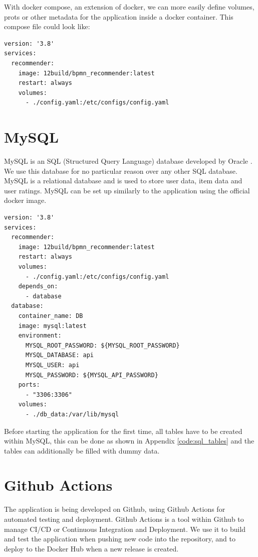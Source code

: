 With docker compose, an extension of docker, we can more easily define volumes, prots or other metadata for the application inside a docker container. This compose file could look like:

\begin{verbatim}
version: '3.8'
services:
  recommender:
    image: 12build/bpmn_recommender:latest
    restart: always
    volumes:
      - ./config.yaml:/etc/configs/config.yaml
\end{verbatim}

\section{MySQL}

\label{sec:sql}

MySQL is an SQL (Structured Query Language) database developed by Oracle \cite{MySQL}. We use this database for no particular reason over any other SQL database. MySQL is a relational database and is used to store user data, item data and user ratings. MySQL can be set up similarly to the application using the official docker image.

\begin{verbatim}
version: '3.8'
services:
  recommender:
    image: 12build/bpmn_recommender:latest
    restart: always
    volumes:
      - ./config.yaml:/etc/configs/config.yaml
    depends_on:
      - database
  database:
    container_name: DB
    image: mysql:latest
    environment:
      MYSQL_ROOT_PASSWORD: ${MYSQL_ROOT_PASSWORD}
      MYSQL_DATABASE: api
      MYSQL_USER: api
      MYSQL_PASSWORD: ${MYSQL_API_PASSWORD}
    ports:
      - "3306:3306"
    volumes:
      - ./db_data:/var/lib/mysql
\end{verbatim}

Before starting the application for the first time, all tables have to be created within MySQL, this can be done as shown in Appendix \ref{code:sql_tables} and the tables can additionally be filled with dummy data.

\section{Github Actions}

\label{sec:github_actions}

The application is being developed on Github, using Github Actions for automated testing and deployment. Github Actions is a tool within Github to manage CI/CD or Continuous Integration and Deployment. We use it to build and test the application when pushing new code into the repository, and to deploy to the Docker Hub when a new release is created.

